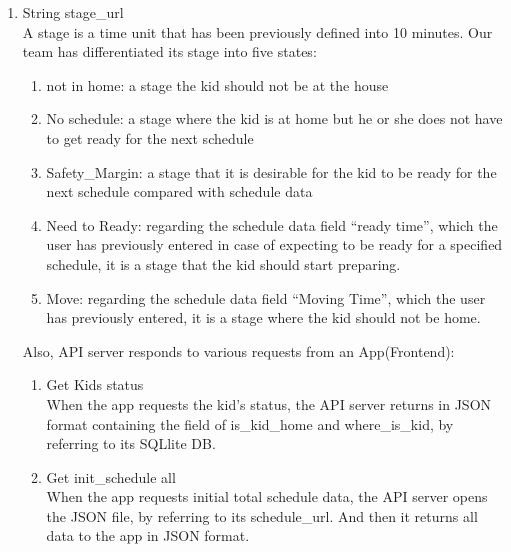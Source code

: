 \documentclass[conference]{IEEEtran}
\begin{document}
\begin{enumerate}[label=\arabic*.]
\begin{enumerate}[label=\arabic*.]
\begin{enumerate}[label=\alph*.]
\begin{enumerate}[label=\roman*.]
        \end{enumerate}
    \item {\large{String stage\_url}} \\
    A stage is a time unit that has been previously defined into 10 minutes. Our team has differentiated its stage into five states: \\
        \begin{enumerate}[label=\roman*.]
            \item {\large{not in home: a stage the kid should not be at the house }} \\
            \item {\large{No schedule: a stage where the kid is at home but he or she does not have to get ready for the next schedule }} \\
            \item {\large{Safety\_Margin: a stage that it is desirable for the kid to be ready for the next schedule compared with schedule data }} \\
            \item {\large{Need to Ready: regarding the schedule data field “ready time”, which the user has previously entered in case of expecting to be ready for a specified schedule, it is a stage that the kid should start preparing. }} \\
            \item {\large{Move: regarding the schedule data field “Moving Time”, which the user has previously entered, it is a stage where the kid should not be home. }} \\
        \end{enumerate}
    Also, API server responds to various requests from an App(Frontend):\\
        \begin{enumerate}[label=\roman*.]
            \item {\large{Get Kids status }}\\
            When the app requests the kid’s status, the API server returns in JSON format containing the field of is\_kid\_home and where\_is\_kid, by referring to its SQLlite DB. \\
            \item {\large{Get init\_schedule all }} \\
            When the app requests initial total schedule data, the API server opens the JSON file, by referring to its schedule\_url. And then it returns all data to the app in JSON format. \\

\end{enumerate}
\end{enumerate}
\end{enumerate}
\end{enumerate}
\end{document}
